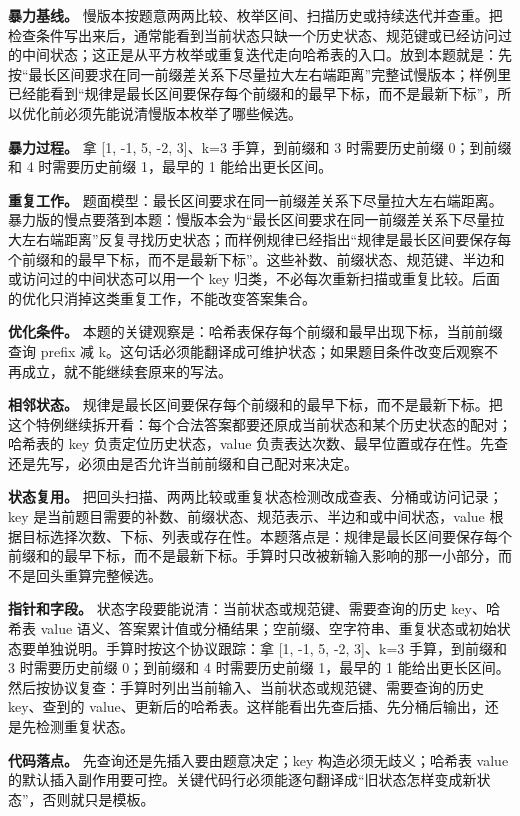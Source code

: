 \textbf{暴力基线。} 慢版本按题意两两比较、枚举区间、扫描历史或持续迭代并查重。把检查条件写出来后，通常能看到当前状态只缺一个历史状态、规范键或已经访问过的中间状态；这正是从平方枚举或重复迭代走向哈希表的入口。放到本题就是：先按“最长区间要求在同一前缀差关系下尽量拉大左右端距离”完整试慢版本；样例里已经能看到“规律是最长区间要保存每个前缀和的最早下标，而不是最新下标”，所以优化前必须先能说清慢版本枚举了哪些候选。

\textbf{暴力过程。} 拿 [1, -1, 5, -2, 3]、k=3 手算，到前缀和 3 时需要历史前缀 0；到前缀和 4 时需要历史前缀 1，最早的 1 能给出更长区间。

\textbf{重复工作。} 题面模型：最长区间要求在同一前缀差关系下尽量拉大左右端距离。暴力版的慢点要落到本题：慢版本会为“最长区间要求在同一前缀差关系下尽量拉大左右端距离”反复寻找历史状态；而样例规律已经指出“规律是最长区间要保存每个前缀和的最早下标，而不是最新下标”。这些补数、前缀状态、规范键、半边和或访问过的中间状态可以用一个 key 归类，不必每次重新扫描或重复比较。后面的优化只消掉这类重复工作，不能改变答案集合。

\textbf{优化条件。} 本题的关键观察是：哈希表保存每个前缀和最早出现下标，当前前缀查询 prefix 减 k。这句话必须能翻译成可维护状态；如果题目条件改变后观察不再成立，就不能继续套原来的写法。

\textbf{相邻状态。} 规律是最长区间要保存每个前缀和的最早下标，而不是最新下标。把这个特例继续拆开看：每个合法答案都要还原成当前状态和某个历史状态的配对；哈希表的 key 负责定位历史状态，value 负责表达次数、最早位置或存在性。先查还是先写，必须由是否允许当前前缀和自己配对来决定。

\textbf{状态复用。} 把回头扫描、两两比较或重复状态检测改成查表、分桶或访问记录；key 是当前题目需要的补数、前缀状态、规范表示、半边和或中间状态，value 根据目标选择次数、下标、列表或存在性。本题落点是：规律是最长区间要保存每个前缀和的最早下标，而不是最新下标。手算时只改被新输入影响的那一小部分，而不是回头重算完整候选。

\textbf{指针和字段。} 状态字段要能说清：当前状态或规范键、需要查询的历史 key、哈希表 value 语义、答案累计值或分桶结果；空前缀、空字符串、重复状态或初始状态要单独说明。手算时按这个协议跟踪：拿 [1, -1, 5, -2, 3]、k=3 手算，到前缀和 3 时需要历史前缀 0；到前缀和 4 时需要历史前缀 1，最早的 1 能给出更长区间。然后按协议复查：手算时列出当前输入、当前状态或规范键、需要查询的历史 key、查到的 value、更新后的哈希表。这样能看出先查后插、先分桶后输出，还是先检测重复状态。

\textbf{代码落点。} 先查询还是先插入要由题意决定；key 构造必须无歧义；哈希表 value 的默认插入副作用要可控。关键代码行必须能逐句翻译成“旧状态怎样变成新状态”，否则就只是模板。

